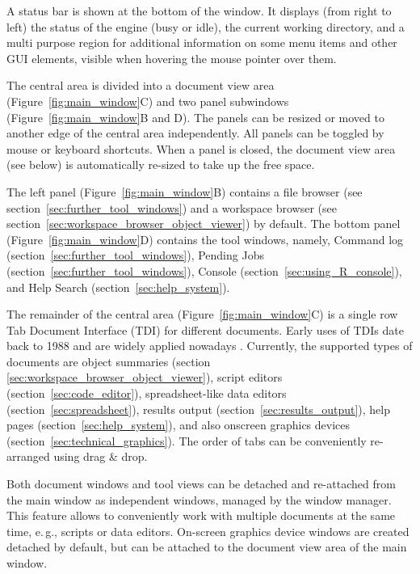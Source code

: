 A status bar is shown at the bottom of the window. It displays (from
right to left) the status of the  engine (busy or idle), the
current working directory, and a multi purpose region for additional
information on some menu items and other GUI elements, visible when
hovering the mouse pointer over them.

The central area is divided into a document view area
(Figure~\ref{fig:main_window}C) and two panel subwindows
(Figure~\ref{fig:main_window}B and D). The panels can be resized or moved to
another edge of the central area independently. All panels can be
toggled by mouse or keyboard shortcuts. When a panel is closed, the
document view area (see below) is automatically re-sized to take up the
free space.

The left panel (Figure~\ref{fig:main_window}B) contains a file browser (see section~\ref{sec:further_tool_windows}) and a
workspace browser (see section~\ref{sec:workspace_browser_object_viewer}) by default. The
bottom panel (Figure~\ref{fig:main_window}D) contains the tool windows, namely, Command
log (section~\ref{sec:further_tool_windows}), Pending Jobs (section~\ref{sec:further_tool_windows}),  Console
(section~\ref{sec:using_R_console}), and Help Search (section~\ref{sec:help_system}).

The remainder of the central area (Figure~\ref{fig:main_window}C) is a single row Tab Document
Interface (TDI) for different documents. Early uses of TDIs date back to 1988 and are
widely applied nowadays \citep{Hopkins2005, MDN2010,
KimLutteroth2010}. Currently, the supported types of
documents are object summaries (section \ref{sec:workspace_browser_object_viewer}), 
script editors (section~\ref{sec:code_editor}), spreadsheet-like data editors 
(section~\ref{sec:spreadsheet}), results output (section~\ref{sec:results_output}), 
help pages (section~\ref{sec:help_system}), and also
 onscreen graphics devices (section~\ref{sec:technical_graphics}). 
The order of tabs can be conveniently re-arranged
using drag \& drop.

Both document windows and tool views can be detached and re-attached from the main
window as independent windows, managed by the window manager. This feature allows to 
conveniently work with multiple documents
at the same time, e.\,g., scripts or data editors. On{}-screen
graphics device windows are created detached by default, but can 
be attached to the document view area of the main window.

